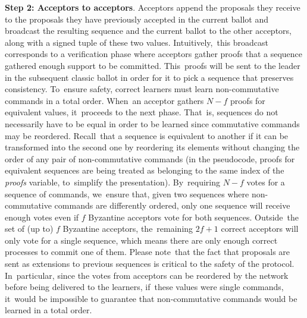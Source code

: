 \documentclass[algorithms,article,accept,moreauthors,pdftex,10pt,a4paper]{Definitions/mdpi}
\begin{document}
{\bf Step 2: Acceptors to acceptors}.
Acceptors append the proposals they receive to the proposals they have previously accepted in the current ballot and broadcast the resulting sequence and the current ballot to the other acceptors, along with a signed tuple of these two values. Intuitively,~this broadcast corresponds to a verification phase where acceptors gather proofs that a sequence gathered enough support to be committed. This~proofs will be sent to the leader in the subsequent classic ballot in order for it to pick a sequence that preserves consistency. To~ensure safety, correct learners must learn non-commutative commands in a total order. When~an acceptor gathers $N-f$ proofs for equivalent values, it~proceeds to the next phase. That~is, sequences do not necessarily have to be equal in order to be learned since commutative commands may be reordered. Recall~that a sequence is equivalent to another if it can be transformed into the second one by reordering its elements without changing the order of any pair of non-commutative commands (in the pseudocode, proofs for equivalent sequences are being treated as belonging to the same index of the \emph{proofs} variable, to~simplify the presentation). By~requiring $N-f$ votes for a sequence of commands, we~ensure that, given two sequences where non-commutative commands are differently ordered, only one sequence will receive enough votes even if $f$ Byzantine acceptors vote for both sequences. Outside~the set of (up to) $f$ Byzantine acceptors, the~remaining $2f+1$ correct acceptors will only vote for a single sequence, which means there are only enough correct processes to commit one of them. Please note~that the fact that proposals are sent as extensions to previous sequences is critical to the safety of the protocol. In~particular, since the votes from acceptors can be reordered by the network before being delivered to the learners, if~these values were single commands, it~would be impossible to guarantee that non-commutative commands would be learned in a total order. 
\end{document}
